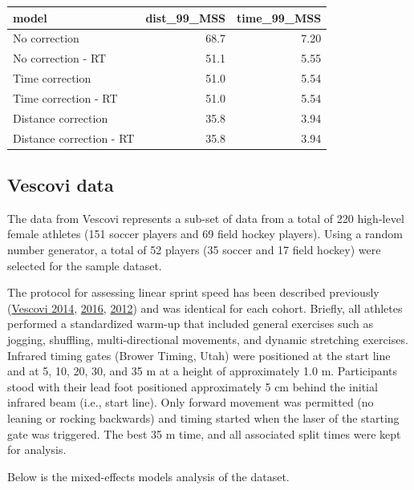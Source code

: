 \documentclass[fleqn,10pt,lineno]{wlpeerj} %
\begin{document}
\begin{tabular}{lrr}
\toprule
model & dist\_99\_MSS & time\_99\_MSS\\
\midrule
No correction & 68.7 & 7.20\\
No correction - RT & 51.1 & 5.55\\
Time correction & 51.0 & 5.54\\
Time correction - RT & 51.0 & 5.54\\
Distance correction & 35.8 & 3.94\\
\addlinespace
Distance correction - RT & 35.8 & 3.94\\
\bottomrule
\end{tabular}

\hypertarget{vescovi-data}{%
\subsection{Vescovi data}\label{vescovi-data}}

The data from Vescovi represents a sub-set of data from a total of 220 high-level female athletes (151 soccer players and 69 field hockey players). Using a random number generator, a total of 52 players (35 soccer and 17 field hockey) were selected for the sample dataset.

The protocol for assessing linear sprint speed has been described previously (\protect\hyperlink{ref-vescoviImpactMaximumSpeed2014}{Vescovi 2014}, \protect\hyperlink{ref-vescoviLocomotorHeartRateMetabolic2016}{2016}, \protect\hyperlink{ref-vescoviSprintSpeedCharacteristics2012}{2012}) and was identical for each cohort. Briefly, all athletes performed a standardized warm-up that included general exercises such as jogging, shuffling, multi-directional movements, and dynamic stretching exercises. Infrared timing gates (Brower Timing, Utah) were positioned at the start line and at 5, 10, 20, 30, and 35 m at a height of approximately 1.0 m. Participants stood with their lead foot positioned approximately 5 cm behind the initial infrared beam (i.e., start line). Only forward movement was permitted (no leaning or rocking backwards) and timing started when the laser of the starting gate was triggered. The best 35 m time, and all associated split times were kept for analysis.

Below is the mixed-effects models analysis of the dataset.
\end{document}
